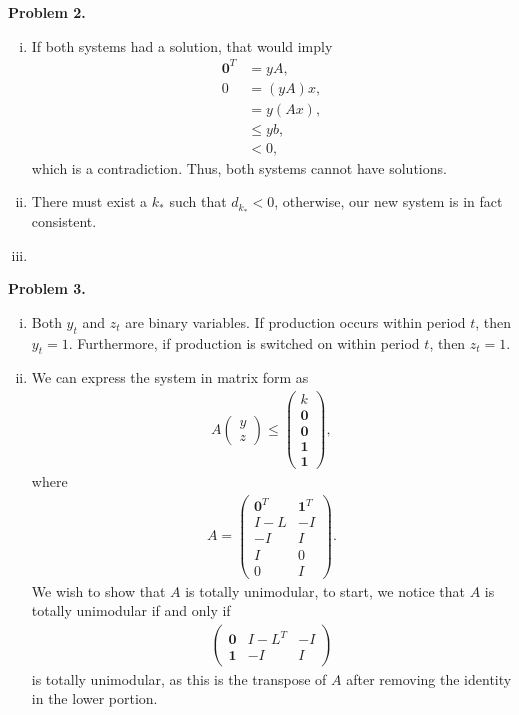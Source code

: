 \documentclass[11pt,a4paper]{article}
\begin{document}
\textbf{Problem 2.}
\begin{enumerate}[i)]
	\item
	If both systems had a solution, that would imply
	\begin{align*}
		\mathbf{0}^T &= yA, \\
		0 &= (y A) x, \\
		&= y (A x), \\
		&\leq yb, \\
		&< 0,
	\end{align*}
	which is a contradiction. Thus, both systems cannot have solutions.
	\item
	There must exist a $k_*$ such that $d_{k_*} < 0$, otherwise, our new system is in fact consistent.




	\item
\end{enumerate}

\textbf{Problem 3.}
\begin{enumerate}[i)]
	\item Both $y_t$ and $z_t$ are binary variables. If production occurs within period $t$, then $y_t = 1$. Furthermore, if production is switched on within period $t$, then $z_t = 1$.
	\item We can express the system in matrix form as
	\begin{align*}
		A
		\begin{pmatrix}
			y \\
			z
		\end{pmatrix}
		\leq
		\begin{pmatrix}
			k \\
			\mathbf{0} \\
			\mathbf{0} \\
			\mathbf{1} \\
			\mathbf{1}
		\end{pmatrix},
	\end{align*}
	where
	\begin{align*}
		A =
		\begin{pmatrix}
			\mathbf{0}^T & \mathbf{1}^T \\
			I - L & -I \\
			-I & I \\
			I & 0 \\
			0 & I
		\end{pmatrix}.
	\end{align*}
	We wish to show that $A$ is totally unimodular, to start, we notice that $A$ is totally unimodular if and only if
	\begin{align*}
		\begin{pmatrix}
			\mathbf{0} & I - L^T & -I \\
			\mathbf{1} & -I & I
		\end{pmatrix}
	\end{align*}
	is totally unimodular, as this is the transpose of $A$ after removing the identity in the lower portion.
\end{enumerate}
\end{document}
